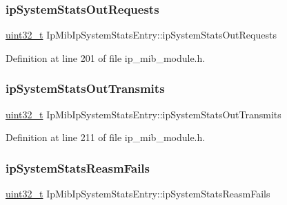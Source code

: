 \subsubsection{\texorpdfstring{ip\+System\+Stats\+Out\+Requests}{ipSystemStatsOutRequests}}
{\footnotesize\ttfamily \hyperlink{stdint_8h_a435d1572bf3f880d55459d9805097f62}{uint32\+\_\+t} Ip\+Mib\+Ip\+System\+Stats\+Entry\+::ip\+System\+Stats\+Out\+Requests}



Definition at line 201 of file ip\+\_\+mib\+\_\+module.\+h.

\mbox{\label{structIpMibIpSystemStatsEntry_a222abab82d71d1b207bcc7eba30b5729}} 
\subsubsection{\texorpdfstring{ip\+System\+Stats\+Out\+Transmits}{ipSystemStatsOutTransmits}}
{\footnotesize\ttfamily \hyperlink{stdint_8h_a435d1572bf3f880d55459d9805097f62}{uint32\+\_\+t} Ip\+Mib\+Ip\+System\+Stats\+Entry\+::ip\+System\+Stats\+Out\+Transmits}



Definition at line 211 of file ip\+\_\+mib\+\_\+module.\+h.

\mbox{\label{structIpMibIpSystemStatsEntry_a60e29bbaccec4fc97d009f1900717327}} 
\subsubsection{\texorpdfstring{ip\+System\+Stats\+Reasm\+Fails}{ipSystemStatsReasmFails}}
{\footnotesize\ttfamily \hyperlink{stdint_8h_a435d1572bf3f880d55459d9805097f62}{uint32\+\_\+t} Ip\+Mib\+Ip\+System\+Stats\+Entry\+::ip\+System\+Stats\+Reasm\+Fails}



